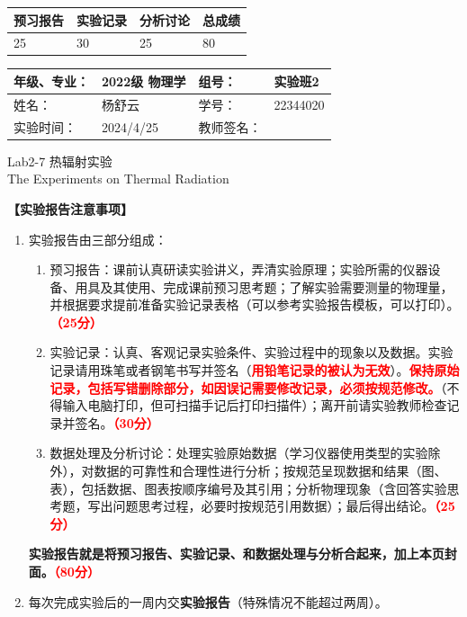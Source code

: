 \documentclass[dvipsnames, svgnames,a4paper,11pt]{article}
\begin{document}
	
	
	
	
	\begin{table}
		\renewcommand\arraystretch{1.7}
		\begin{tabularx}{\textwidth}{
				|X|X|X|X
				|X|X|X|X|}
			\hline
			\multicolumn{2}{|c|}{预习报告}&\multicolumn{2}{|c|}{实验记录}&\multicolumn{2}{|c|}{分析讨论}&\multicolumn{2}{|c|}{总成绩}\\
			\hline
			\LARGE25 & & \LARGE30 & & \LARGE25 & & \LARGE80 & \\
			\hline
		\end{tabularx}
	\end{table}
	
	\begin{table}
		\renewcommand\arraystretch{1.7}
		\begin{tabularx}{\textwidth}{|X|X|X|X|}
			\hline
			年级、专业： & 2022级 物理学 &组号： & 实验班2\\
			\hline
			姓名： & 杨舒云  & 学号： & 22344020\\
			\hline
			实验时间： & 2024/4/25 & 教师签名： & \\
			\hline
		\end{tabularx}
	\end{table}
	
	\begin{center}
		\LARGE Lab2-7 \quad 热辐射实验\\The Experiments on Thermal Radiation
	\end{center}
	
	
	\textbf{【实验报告注意事项】}
	\begin{enumerate}
		\item 实验报告由三部分组成：
		\begin{enumerate}
			\item 预习报告：课前认真研读实验讲义，弄清实验原理；实验所需的仪器设备、用具及其使用、完成课前预习思考题；了解实验需要测量的物理量，并根据要求提前准备实验记录表格（可以参考实验报告模板，可以打印）。\textcolor{red}{\textbf{（25分）}}
			\item 实验记录：认真、客观记录实验条件、实验过程中的现象以及数据。实验记录请用珠笔或者钢笔书写并签名（\textcolor{red}{\textbf{用铅笔记录的被认为无效}}）。\textcolor{red}{\textbf{保持原始记录，包括写错删除部分，如因误记需要修改记录，必须按规范修改。}}（不得输入电脑打印，但可扫描手记后打印扫描件）；离开前请实验教师检查记录并签名。\textcolor{red}{\textbf{（30分）}}
			\item 数据处理及分析讨论：处理实验原始数据（学习仪器使用类型的实验除外），对数据的可靠性和合理性进行分析；按规范呈现数据和结果（图、表），包括数据、图表按顺序编号及其引用；分析物理现象（含回答实验思考题，写出问题思考过程，必要时按规范引用数据）；最后得出结论。\textcolor{red}{\textbf{（25分）}}
		\end{enumerate}
		\textbf{实验报告就是将预习报告、实验记录、和数据处理与分析合起来，加上本页封面。\textcolor{red}{（80分）}}
		\item 每次完成实验后的一周内交\textbf{实验报告}（特殊情况不能超过两周）。
	\end{enumerate}
	
\end{document}
